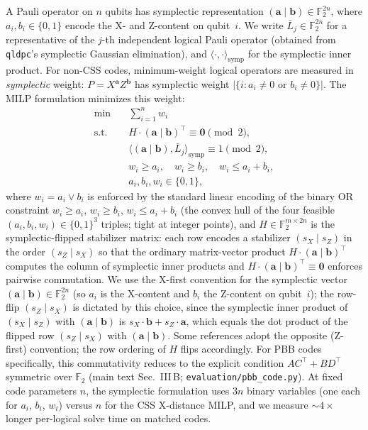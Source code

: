 \documentclass[aps,prxquantum,twocolumn,superscriptaddress,nofootinbib]{revtex4-2}
\newcommand{\FF}{\ensuremath{\mathbb{F}}}
\begin{document}
A Pauli operator on $n$ qubits has symplectic representation $(\mathbf{a} \mid \mathbf{b}) \in \FF_2^{2n}$, where $a_i, b_i \in \{0,1\}$ encode the X- and Z-content on qubit~$i$.
We write $\bar{L}_j \in \FF_2^{2n}$ for a representative of the $j$-th independent logical Pauli operator (obtained from \texttt{qldpc}'s symplectic Gaussian elimination), and $\langle \cdot, \cdot \rangle_{\text{symp}}$ for the symplectic inner product.
For non-CSS codes, minimum-weight logical operators are measured in \emph{symplectic} weight: $P = X^{\mathbf{a}} Z^{\mathbf{b}}$ has symplectic weight $|\{i : a_i \neq 0 \text{ or } b_i \neq 0\}|$.
The MILP formulation minimizes this weight:
\begin{align}
\min \quad & \sum_{i=1}^{n} w_i \\
\text{s.t.} \quad & H \cdot (\mathbf{a} \mid \mathbf{b})^\top \equiv \mathbf{0} \pmod{2}, \\
& \langle (\mathbf{a} \mid \mathbf{b}), \bar{L}_j \rangle_{\text{symp}} \equiv 1 \pmod{2}, \\
& w_i \geq a_i, \quad w_i \geq b_i, \quad w_i \leq a_i + b_i, \\
& a_i, b_i, w_i \in \{0,1\},
\end{align}
where $w_i = a_i \lor b_i$ is enforced by the standard linear encoding of the binary OR constraint $w_i \geq a_i$, $w_i \geq b_i$, $w_i \leq a_i + b_i$ (the convex hull of the four feasible $(a_i, b_i, w_i) \in \{0,1\}^3$ triples; tight at integer points), and $H \in \FF_2^{m \times 2n}$ is the symplectic-flipped stabilizer matrix: each row encodes a stabilizer $(s_X \mid s_Z)$ in the order $(s_Z \mid s_X)$ so that the ordinary matrix-vector product $H \cdot (\mathbf{a} \mid \mathbf{b})^\top$ computes the column of symplectic inner products and $H \cdot (\mathbf{a} \mid \mathbf{b})^\top \equiv \mathbf{0}$ enforces pairwise commutation.
We use the X-first convention for the symplectic vector $(\mathbf{a} \mid \mathbf{b}) \in \FF_2^{2n}$ (so $a_i$ is the X-content and $b_i$ the Z-content on qubit~$i$); the row-flip $(s_Z \mid s_X)$ is dictated by this choice, since the symplectic inner product of $(s_X \mid s_Z)$ with $(\mathbf{a} \mid \mathbf{b})$ is $s_X \!\cdot \mathbf{b} + s_Z \!\cdot \mathbf{a}$, which equals the dot product of the flipped row $(s_Z \mid s_X)$ with $(\mathbf{a} \mid \mathbf{b})$. Some references adopt the opposite (Z-first) convention; the row ordering of $H$ flips accordingly. For PBB codes specifically, this commutativity reduces to the explicit condition $A C^\top + B D^\top$ symmetric over $\FF_2$ (main text Sec.~III\,B; \texttt{evaluation/pbb\_code.py}).
At fixed code parameters $n$, the symplectic formulation uses $3n$ binary variables (one each for $a_i$, $b_i$, $w_i$) versus $n$ for the CSS X-distance MILP, and we measure ${\sim}4\times$ longer per-logical solve time on matched codes.
\end{document}
